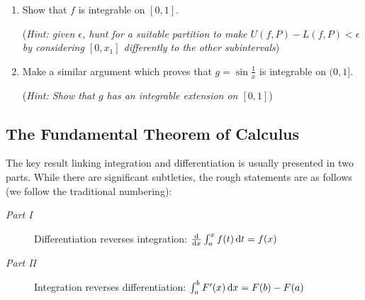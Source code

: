 \begin{exercises}
\begin{enumerate}
\begin{enumerate}
	    \item Show that $f$ is integrable on $[0,1]$.\par
	    (\emph{Hint: given $\epsilon$, hunt for a suitable partition to make $U(f,P)-L(f,P)<\epsilon$ by considering $[0,x_1]$ differently to the other subintervals})
	    
	    \item Make a similar argument which proves that $g=\sin\frac 1x$ is integrable on $(0,1]$.\par
	    (\emph{Hint: Show that $g$ has an integrable extension on $[0,1]$})
	  \end{enumerate}
	
	\end{enumerate}
\end{exercises}


\clearpage


\subsection{The Fundamental Theorem of Calculus}\label{sec:ftc}

The key result linking integration and differentiation is usually presented in two parts. While there are significant subtleties, the rough statements are as follows (we follow the traditional numbering):

\begin{description}
	\item[\normalfont\emph{Part I} ] Differentiation reverses integration: $\frac{\mathrm{d} }{\mathrm{d} x}\int_a^xf(t)\,{\mathrm{d} t}=f(x)$
	\item[\normalfont\emph{Part II} ] Integration reverses differentiation: $\int_a^bF'(x)\,{\mathrm{d} x} =F(b)-F(a)$
\end{description}

